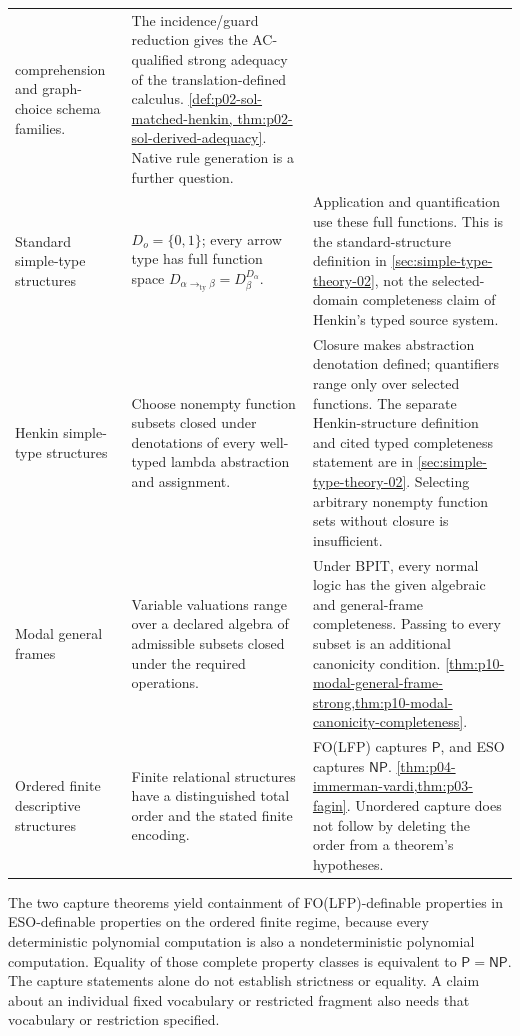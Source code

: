 \begin{longtable}{@{}p{}p{}p{}@{}}
comprehension and graph-choice schema families. &
The incidence/guard reduction gives the AC-qualified strong adequacy of
the translation-defined calculus. \cref{def:p02-sol-matched-henkin,
thm:p02-sol-derived-adequacy}. Native rule generation is a further question. \\
Standard simple-type structures &
\(D_o=\{0,1\}\); every arrow type has full function space
\(D_{\alpha\to_{\mathrm{ty}}\beta}=D_\beta^{D_\alpha}\). &
Application and quantification use these full functions. This is
the standard-structure definition in \cref{sec:simple-type-theory-02},
not the selected-domain completeness
claim of Henkin's typed source system. \\
Henkin simple-type structures & Choose nonempty function subsets closed
under denotations of every well-typed lambda abstraction and assignment. &
Closure makes abstraction denotation defined; quantifiers range only over
selected functions. The separate Henkin-structure definition and cited
typed completeness statement are in \cref{sec:simple-type-theory-02}.
Selecting arbitrary nonempty function
sets without closure is insufficient. \\
Modal general frames & Variable valuations range over a declared algebra
of admissible subsets closed under the required operations. & Under BPIT,
every normal logic has the given algebraic and general-frame completeness.
Passing to every subset is an additional canonicity condition.
\cref{thm:p10-modal-general-frame-strong,thm:p10-modal-canonicity-completeness}. \\
Ordered finite descriptive structures & Finite relational structures have
a distinguished total order and the stated finite encoding. &
FO(LFP) captures \(\mathsf P\), and ESO captures \(\mathsf{NP}\).
\cref{thm:p04-immerman-vardi,thm:p03-fagin}. Unordered capture does not
follow by deleting the order from a theorem's hypotheses. \\
\bottomrule
\end{longtable}

The two capture theorems yield containment of FO(LFP)-definable properties
in ESO-definable properties on the ordered finite regime, because every
deterministic polynomial computation is also a nondeterministic polynomial
computation. Equality of those complete property classes is equivalent to
\(\mathsf P=\mathsf{NP}\). The capture statements alone do not establish
strictness or equality. A claim about an individual fixed vocabulary or
restricted fragment also needs that vocabulary or restriction specified.

